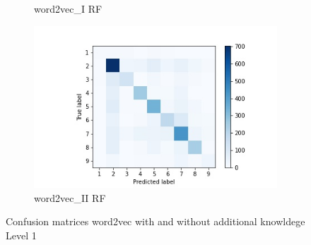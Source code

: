 \documentclass[12pt, a4paper, titlepage]{article}
\begin{document}
\begin{figure}
\begin{subfigure}[b]{0.475\textwidth}
    {{\small word2vec\_I \ac{RF}}}    
  \end{subfigure}
  \hfill
  \begin{subfigure}[b]{0.475\textwidth}   
      \centering 
      \includegraphics[width=\textwidth]{cm_word2vec_with_RF.jpg}
      {{\small word2vec\_II \ac{RF}}}    
  \end{subfigure}
  \caption{\label{fig: F23} Confusion matrices word2vec with and without additional knowldege Level 1}
\end{figure}
\end{document}

